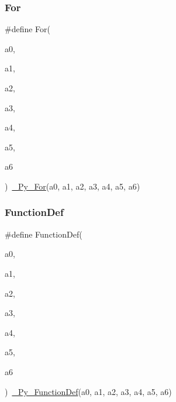 \mbox{\label{_python-ast_8h_a8392a32b4f002d4b372598185b549a1d}} 
\subsubsection{\texorpdfstring{For}{For}}
{\footnotesize\ttfamily \#define For(\begin{DoxyParamCaption}\item[{}]{a0,  }\item[{}]{a1,  }\item[{}]{a2,  }\item[{}]{a3,  }\item[{}]{a4,  }\item[{}]{a5,  }\item[{}]{a6 }\end{DoxyParamCaption})~\mbox{\hyperlink{_python-ast_8h_a53baf77d5304f3cbae00f4a06e5f1731}{\+\_\+\+Py\+\_\+\+For}}(a0, a1, a2, a3, a4, a5, a6)}

\mbox{\label{_python-ast_8h_a123bf3266f8916d4150c6620533ce429}} 
\subsubsection{\texorpdfstring{FunctionDef}{FunctionDef}}
{\footnotesize\ttfamily \#define Function\+Def(\begin{DoxyParamCaption}\item[{}]{a0,  }\item[{}]{a1,  }\item[{}]{a2,  }\item[{}]{a3,  }\item[{}]{a4,  }\item[{}]{a5,  }\item[{}]{a6 }\end{DoxyParamCaption})~\mbox{\hyperlink{_python-ast_8h_adf3e1a9736a5443058274bcd750304fb}{\+\_\+\+Py\+\_\+\+Function\+Def}}(a0, a1, a2, a3, a4, a5, a6)}

\mbox{\label{_python-ast_8h_a1e309a988adeb91682c14a36c35bc7f5}} 
